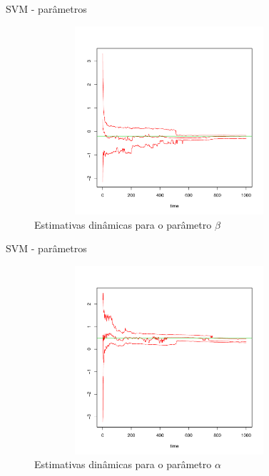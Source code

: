 \documentclass{beamer}
\begin{document}
\begin{frame}{SVM - parâmetros}


 \begin{figure}
\begin{center}
 \includegraphics[height=7cm,width =10cm]{beta_1_01_02_05.pdf}
 \end{center}
\caption{Estimativas dinâmicas para o parâmetro $\beta$ } 
\end{figure}

 
 \end{frame}
 
 
 \begin{frame}{SVM - parâmetros}


 \begin{figure}
\begin{center}
 \includegraphics[height=7cm,width =10cm]{alpha_1_01_02_05.pdf}
 \end{center}
\caption{Estimativas dinâmicas para o parâmetro $\alpha$ } 
\end{figure}

 \end{frame}
 
\end{document}
